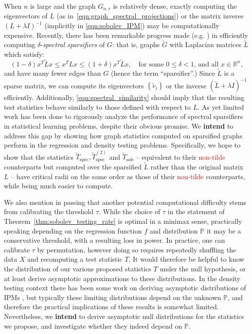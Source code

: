 \documentclass{article}
\newcommand{\Reals}{\mathbb{R}}
\newcommand{\set}[1]{\left\{#1\right\}}
\newcommand{\1}{\mathbf{1}}
\newcommand{\Pbb}{\mathbb{P}}
\theoremstyle{alden}
\theoremstyle{aldenthm}
\theoremstyle{definition}
\theoremstyle{remark}
\begin{document}
When $n$ is large and the graph $G_{n,r}$ is relatively dense, exactly computing the eigenvectors of $L$ (as in~\eqref{eqn:graph_spectral_projections}) or the matrix inverse $(L + \lambda I)^{-1}$ (implicitly in \eqref{eqn:sobolev_IPM}) may be computationally expensive. Recently, there has been remarkable progress made (e.g. \citet{spielman2011,batson13,spielman2014,cohen14}) in efficiently computing $\delta$-\emph{spectral sparsifiers} of $G$: that is, graphs $\widetilde{G}$ with Laplacian matrices $\widetilde{L}$ which satisfy:
\begin{equation}
\label{eqn:spectral_similarity}
(1 - \delta)x^T \widetilde{L} x \leq x^T L x \leq (1 + \delta) x^T \widetilde{L} x, \quad \textrm{for some $0 \leq \delta < 1$, and all $x \in \Reals^n$,}
\end{equation}
and have many fewer edges than $G$ (hence the term ``sparsifier''.) Since $\widetilde{L}$ is a sparse matrix, we can compute its eigenvectors $\set{\widetilde{v}_i}$ or the inverse $(\widetilde{L} + \lambda I)^{-1}$  efficiently. Additionally, \eqref{eqn:spectral_similarity} should imply that the resulting test statistics behave similarly to those defined with respect to $L$. As yet limited work \citet{vonluxburg2014,sadhanala16b} has been done to rigorously analyze the performance of spectral sparsifiers in statistical learning problems, despite their obvious promise. We \textbf{intend} to address this gap by showing how graph statistics computed on sparsified graphs perform in the regression and density testing problems. Specifically, we hope to show that the statistics $\widetilde{T}_{\mathrm{spec}}, \widetilde{T}_{\mathrm{spec}}^{(2)}$ and $\widetilde{T}_{\mathrm{sob}}$ -- equivalent to their \textcolor{red}{non-tilde} counterparts but computed over the sparsified $\widetilde{L}$ rather than the original matrix $L$ -- have critical radii on the same order as those of their \textcolor{red}{non-tilde} counterparts, while being much easier to compute.

We also mention in passing that another potential computational difficulty stems from calibrating the threshold $\tau$. While the choice of $\tau$ in the statement of Theorem~\ref{thm:sobolev_testing_rate} is optimal in a minimax sense, practically speaking depending on the regression function $f$ and distribution $\Pbb$ it may be a conservative threshold, with a resulting loss in power. In practice, one can calibrate $\tau$ by permutation, however doing so requires repeatedly shuffling the data $X$ and recomputing a test statistic $T$. It would therefore be helpful to know the distribution of our various proposed statistics $T$ under the null hypothesis, or at least derive asymptotic approximations to these distributions. In the density testing context there has been some work on deriving asymptotic distributions of IPMs \cite{gretton12,sadhanala19}, but typically these limiting distributions depend on the unknown $\mathbb{P}$, and therefore the practical implications of these results is somewhat limited. Nevertheless, we \textbf{intend} to derive asymptotic null distributions for the statistics we propose, and investigate whether they indeed depend on $\mathbb{P}$. 
\end{document}
